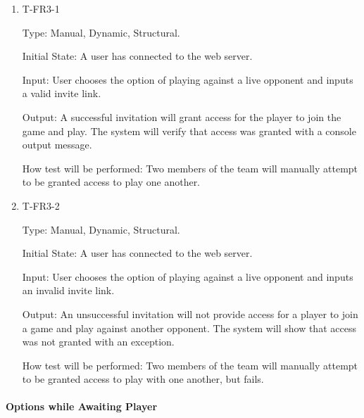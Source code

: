 \documentclass[12pt, titlepage]{article}
\begin{document}
        \begin{enumerate}

        \item{T-FR3-1\\}

            Type: Manual, Dynamic, Structural.
            					
            Initial State: A user has connected to the web server.
            					
            Input: User chooses the option of playing against a live opponent and inputs a valid invite link.
            					
            Output: A successful invitation will grant access for the player to join the game and play. The system will verify that access was granted with a console output message.
            					
            How test will be performed: Two members of the team will manually attempt to be granted access to play one another. 

        \item{T-FR3-2\\}

            Type: Manual, Dynamic, Structural.
            					
            Initial State: A user has connected to the web server.
            					
            Input: User chooses the option of playing against a live opponent and inputs an invalid invite link.
            					
            Output: An unsuccessful invitation will not provide access for a player to join a game and play against another opponent. The system will show that access was not granted with an exception.
            					
            How test will be performed: Two members of the team will manually attempt to be granted access to play with one another, but fails. 

        \end{enumerate}

    \paragraph{Options while Awaiting Player}
\end{document}
